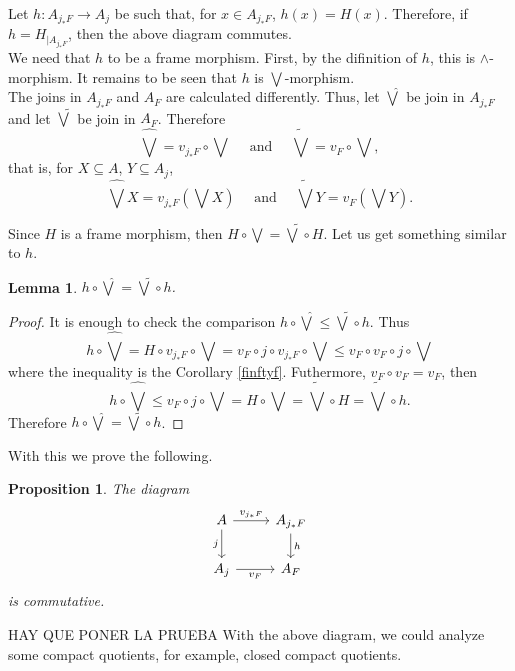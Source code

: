 \documentclass[11pt]{amsart}
\theoremstyle{plain}
\newtheorem{lem}[thm]{Lemma}
\newtheorem{prop}[thm]{Proposition}
\theoremstyle{definition}
\begin{document}
Let $h\colon A_{j_*F}\to A_j$ be such that, for $x\in A_{j_*F}$, $h(x)=H(x)$. Therefore, if $h=H_{\mid{A_{j_*F}}}$, then the above diagram commutes.\\

We need that $h$ to be a frame morphism. First, by the difinition of $h$, this is $\wedge$-morphism. It remains to be seen that $h$ is $\bigvee$-morphism.\\

The joins in $A_{j_*F}$ and $A_F$ are calculated differently. Thus, let $\hat{\bigvee}$ be join in $A_{j_*F}$ and let $\tilde{\bigvee}$ be join in $A_F$. Therefore
\[
\hat{\bigvee}=v_{j_*F}\circ \bigvee\quad\mbox{ and }\quad \tilde{\bigvee}=v_{F}\circ \bigvee,
\] 
that is, for $X\subseteq A$, $Y\subseteq A_j$,
\[
	\hat{\bigvee}X=v_{j_*F}(\bigvee X)\quad\mbox{ and }\quad \tilde{\bigvee}Y=v_{F}(\bigvee Y).
\]

Since $H$ is a frame morphism, then $H\circ \bigvee=\tilde{\bigvee}\circ H$. Let us get something similar to $h$.

\begin{lem}\label{bigvee g}
$h\circ \hat{\bigvee}=\tilde{\bigvee}\circ h$.
\end{lem}

\begin{proof}
It is enough to check the comparison $h\circ \hat{\bigvee}\leq \tilde{\bigvee}\circ h$. Thus
\[
h\circ \hat{\bigvee}=H\circ v_{j_*F}\circ \bigvee=v_F\circ j\circ v_{j_*F}\circ \bigvee\leq v_F\circ v_F\circ j\circ \bigvee
\]
where the inequality is the Corollary \ref{finftyf}. Futhermore, $v_F\circ v_F=v_F$, then
\[
h\circ\hat{\bigvee}\leq v_F\circ j\circ \bigvee =H\circ \bigvee=\tilde{\bigvee}\circ H=\tilde{\bigvee}\circ h.
\]
Therefore $h\circ\hat{\bigvee}=\tilde{\bigvee}\circ h$.
\end{proof}

With this we prove the following.

\begin{prop}\label{VFsquare}
The diagram
\[\begin{tikzcd}
	A & {A_{j_*F}} \\
	{A_j} & {A_F}
	\arrow["{v_{j_*F}}", from=1-1, to=1-2]
	\arrow["j"', from=1-1, to=2-1]
	\arrow["h", from=1-2, to=2-2]
	\arrow["{v_F}"', from=2-1, to=2-2]
\end{tikzcd}\]
is commutative.
\end{prop}
HAY QUE PONER LA PRUEBA
With the above diagram, we could analyze some compact quotients, for example, closed compact quotients.
\end{document}
